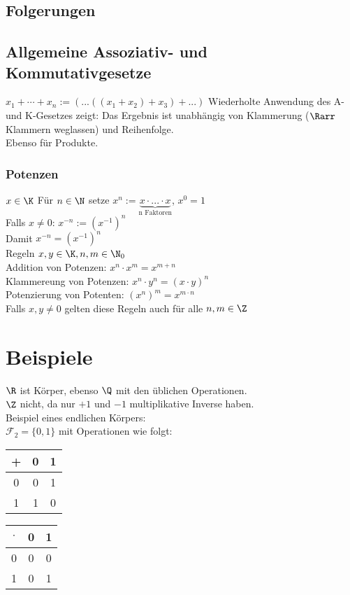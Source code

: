 %
\subsection{Folgerungen}
\subsection*{Allgemeine Assoziativ- und Kommutativgesetze}
$x_1 + \cdots + x_n := (...((x_1 + x_2) + x_3) + ...)$
Wiederholte Anwendung des A- und K-Gesetzes zeigt: Das Ergebnis ist unabhängig von Klammerung ($\Rarr$ Klammern weglassen) und Reihenfolge.\\
Ebenso für Produkte.
\subsubsection*{Potenzen}
$x\in \K$ Für $n \in \N$ setze $x^n := \underbrace{x\cdot ... \cdot x}_{\text{n Faktoren}}$, $x^0 = 1$\\
Falls $x \neq 0$: $x^{-n} := (x^{-1})^n$\\
Damit $x^{-n} = (x^{-1})^n$\\
Regeln $x,y \in \K, n, m \in \N_0$\\
Addition von Potenzen: $x^n \cdot x^m = x^{m+n}$\\
Klammereung von Potenzen: $x^n\cdot y^n = (x\cdot y)^n$\\
Potenzierung von Potenten: $(x^n)^m = x^{m\cdot n}$\\
Falls $x,y \neq 0$ gelten diese Regeln auch für alle $n, m \in \Z$
\section*{Beispiele}
$\R$ ist Körper, ebenso $\Q$ mit den üblichen Operationen.\\
$\Z$ nicht, da nur $+1$ und $-1$ multiplikative Inverse haben.\\
Beispiel eines endlichen Körpers:\\
$\mathcal{F}_2 = \{0,1\}$ mit Operationen wie folgt:\\
\begin{tabular}{c|c|c}
+ & 0 & 1\\\hline
0 & 0 & 1\\
1 & 1 & 0
\end{tabular}\qquad
\begin{tabular}{c|c|c}
$\cdot$ & 0 & 1\\\hline
0 & 0 & 0\\
1 & 0 & 1
\end{tabular}
